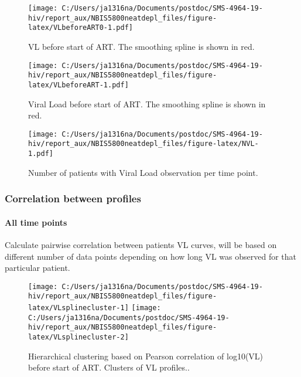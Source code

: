 \documentclass[
]{article}
\begin{document}
\begin{figure}
\centering
\texttt{[image: C:/Users/ja1316na/Documents/postdoc/SMS-4964-19-hiv/report\_aux/NBIS5800neatdepl\_files/figure-latex/VLbeforeART0-1.pdf]}
\caption{\label{fig:VLbeforeART0}VL before start of ART. The smoothing spline is shown in red.}
\end{figure}

\begin{figure}
\centering
\texttt{[image: C:/Users/ja1316na/Documents/postdoc/SMS-4964-19-hiv/report\_aux/NBIS5800neatdepl\_files/figure-latex/VLbeforeART-1.pdf]}
\caption{\label{fig:VLbeforeART}Viral Load before start of ART. The smoothing spline is shown in red.}
\end{figure}

\begin{figure}
\centering
\texttt{[image: C:/Users/ja1316na/Documents/postdoc/SMS-4964-19-hiv/report\_aux/NBIS5800neatdepl\_files/figure-latex/NVL-1.pdf]}
\caption{\label{fig:NVL}Number of patients with Viral Load observation per time point.}
\end{figure}

\FloatBarrier

\hypertarget{correlation-between-profiles}{%
\subsubsection{Correlation between profiles}\label{correlation-between-profiles}}

\hypertarget{all-time-points}{%
\paragraph{All time points}\label{all-time-points}}

Calculate pairwise correlation between patients VL curves, will be based on different number of data points depending on how long VL was observed for that particular patient.

\begin{figure}
\texttt{[image: C:/Users/ja1316na/Documents/postdoc/SMS-4964-19-hiv/report\_aux/NBIS5800neatdepl\_files/figure-latex/VLsplinecluster-1]} \texttt{[image: C:/Users/ja1316na/Documents/postdoc/SMS-4964-19-hiv/report\_aux/NBIS5800neatdepl\_files/figure-latex/VLsplinecluster-2]} \caption{Hierarchical clustering based on Pearson correlation of log10(VL) before start of ART. Clusters of VL profiles..}\label{fig:VLsplinecluster}
\end{figure}
\end{document}
